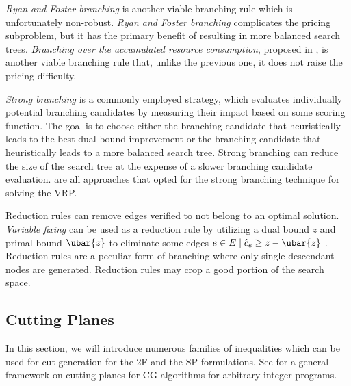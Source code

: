 \textit{Ryan and Foster branching} \parencite{ryan1981integer}
is another viable branching rule which is unfortunately non-robust.
\textit{Ryan and Foster branching} complicates the pricing subproblem,
but it has the primary benefit of resulting in more balanced search trees.
\textit{Branching over the accumulated resource consumption}, proposed in \textcite{gelinas1995new},
is another viable branching rule that,
unlike the previous one, it does not raise the pricing difficulty.

\textit{Strong branching} is a commonly employed strategy,
which evaluates individually potential branching candidates
by measuring their impact based on some scoring function.
The goal is to choose either the branching candidate
that heuristically leads to the best dual bound improvement
or the branching candidate that heuristically leads to a more balanced search tree.
Strong branching can reduce the size of the search tree
at the expense of a slower branching candidate evaluation.
\textcite{fukasawa2006, pecin2017limited, pecin2017new} are all approaches
that opted for the strong branching technique for solving the VRP.

\medskip

Reduction rules can remove edges verified to not belong to an optimal solution.
\textit{Variable fixing} can be used as a reduction rule
by utilizing a dual bound $\bar{z}$ and primal bound $\ubar{z}$
to eliminate some edges $e \in E \mid \hat{c}_e \ge \bar{z} - \ubar{z}$ \parencite{hadjar2006, irnich2010}.
Reduction rules are a peculiar form of branching where only single descendant nodes are generated.
Reduction rules may crop a good portion of the search space.

\subsection{Cutting Planes}
\label{sec:bap-cutting-planes}

In this section, we will introduce numerous families of inequalities
which can be used for cut generation
for the 2F
and the SP
formulations.
See \textcite{desaulniers2011} for a general framework
on cutting planes for CG algorithms for arbitrary integer programs.

